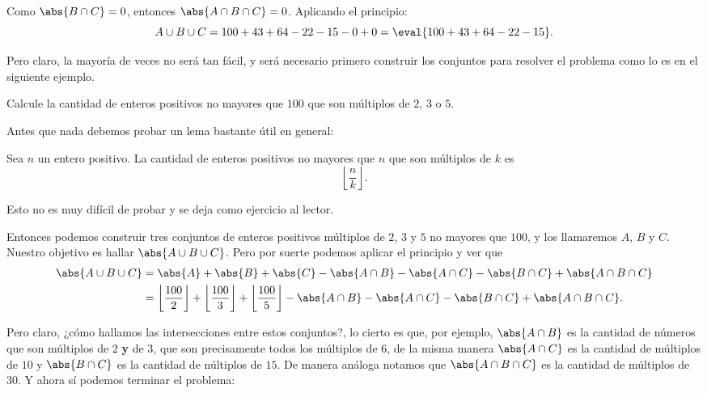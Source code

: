 Como $\abs{B \cap C} = 0$, entonces $\abs{A \cap B \cap C} = 0$.
Aplicando el principio:
\[A \cup B \cup C = 100 + 43 + 64 - 22 - 15 - 0 + 0 = \eval{100 + 43 + 64 - 22 - 15}.\]

Pero claro, la mayoría de veces
no será tan fácil, y será necesario
primero construir los conjuntos
para resolver el problema como
lo es en el siguiente ejemplo.
\begin{example}[No realista]
	Calcule la cantidad de
	enteros positivos no mayores que $100$
	que son múltiplos de $2$, $3$ o $5$.
\end{example}

Antes que nada debemos probar un lema
bastante útil en general:
\begin{lemma}
	Sea $n$ un entero positivo.
	La cantidad de enteros positivos
	no mayores que $n$ que son
	múltiplos de $k$ es
	\[\left\lfloor\frac nk\right\rfloor.\]
\end{lemma}
Esto no es muy difícil de probar y se deja como
ejercicio al lector.

Entonces podemos construir tres conjuntos
de enteros positivos múltiplos de $2$, $3$ y $5$
no mayores que $100$, y los llamaremos
$A$, $B$ y $C$. Nuestro objetivo es hallar
$\abs{A \cup B \cup C}$.
Pero por suerte podemos aplicar el principio y
ver que
\begin{align*}
	\abs{A \cup B \cup C} & = \abs{A} + \abs{B} + \abs{C} - \abs{A \cap B} - \abs{A \cap C} - \abs{B \cap C} + \abs{A \cap B \cap C}                                                                                               \\
	                      & = \left\lfloor\frac{100}{2}\right\rfloor + \left\lfloor\frac{100}{3}\right\rfloor + \left\lfloor\frac{100}{5}\right\rfloor - \abs{A \cap B} - \abs{A \cap C} - \abs{B \cap C} + \abs{A \cap B \cap C}.
\end{align*}

Pero claro, ¿cómo hallamos las intersecciones entre estos
conjuntos?, lo cierto es que, por ejemplo, $\abs{A \cap B}$
es la cantidad de números que son múltiplos de $2$
\textbf{y} de $3$, que son precisamente todos los múltiplos
de $6$, de la misma manera $\abs{A \cap C}$ es
la cantidad de múltiplos de $10$ y $\abs{B \cap C}$
es la cantidad de núltiplos de $15$.
De manera análoga notamos que $\abs{A \cap B \cap C}$
es la cantidad de múltiplos de $30$.
Y ahora sí podemos terminar el problema:

